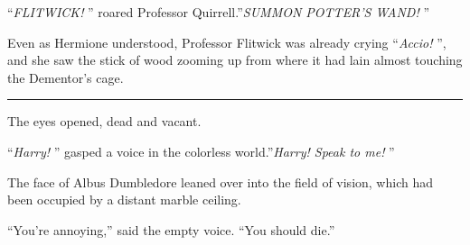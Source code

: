 ``\emph{FLITWICK!} '' roared Professor Quirrell.''\emph{SUMMON POTTER'S
WAND!} ''

Even as Hermione understood, Professor Flitwick was already crying
``\emph{Accio!} '', and she saw the stick of wood zooming up from where it
had lain almost touching the Dementor's cage.

\begin{center}\rule{3in}{0.4pt}\end{center}

The eyes opened, dead and vacant.

``\emph{Harry!} '' gasped a voice in the colorless world.''\emph{Harry!
Speak to me!} ''

The face of Albus Dumbledore leaned over into the field of vision, which
had been occupied by a distant marble ceiling.

``You're annoying,'' said the empty voice. ``You should die.''
